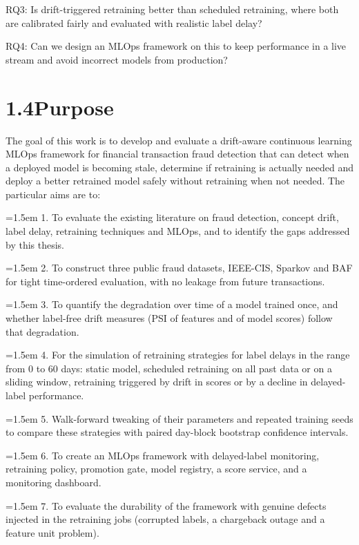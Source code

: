 \documentclass[11pt,letterpaper]{report}
\newcommand{\listitem}[1]{\par\hangindent=1.5em\hangafter=1 #1\par}
\begin{document}
RQ3: Is drift-triggered retraining better than scheduled retraining, where both are calibrated fairly and evaluated with realistic label delay?

RQ4: Can we design an MLOps framework on this to keep performance in a live stream and avoid incorrect models from production?

\section*{1.4\quad Purpose}

The goal of this work is to develop and evaluate a drift-aware continuous learning MLOps framework for financial transaction fraud detection that can detect when a deployed model is becoming stale, determine if retraining is actually needed and deploy a better retrained model safely without retraining when not needed. The particular aims are to:

\listitem{1. To evaluate the existing literature on fraud detection, concept drift, label delay, retraining techniques and MLOps, and to identify the gaps addressed by this thesis.}

\listitem{2. To construct three public fraud datasets, IEEE-CIS, Sparkov and BAF for tight time-ordered evaluation, with no leakage from future transactions.}

\listitem{3. To quantify the degradation over time of a model trained once, and whether label-free drift measures (PSI of features and of model scores) follow that degradation.}

\listitem{4. For the simulation of retraining strategies for label delays in the range from 0 to 60 days: static model, scheduled retraining on all past data or on a sliding window, retraining triggered by drift in scores or by a decline in delayed-label performance.}

\listitem{5. Walk-forward tweaking of their parameters and repeated training seeds to compare these strategies with paired day-block bootstrap confidence intervals.}

\listitem{6. To create an MLOps framework with delayed-label monitoring, retraining policy, promotion gate, model registry, a score service, and a monitoring dashboard.}

\listitem{7. To evaluate the durability of the framework with genuine defects injected in the retraining jobs (corrupted labels, a chargeback outage and a feature unit problem).}
\end{document}

